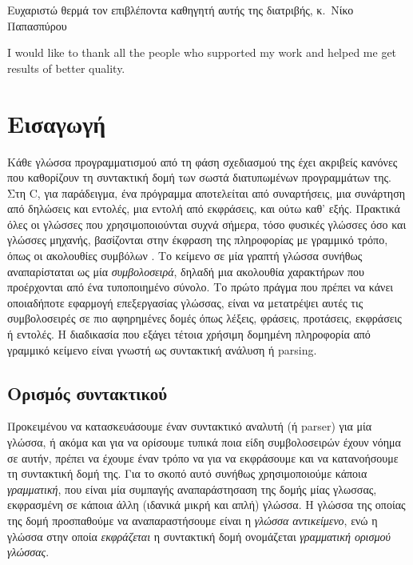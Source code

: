 \documentclass[diploma]{softlab-thesis}
\begin{document}

\begin{acknowledgementsgr}
  Ευχαριστώ θερμά τον επιβλέποντα καθηγητή αυτής της διατριβής,
  κ.~Νίκο Παπασπύρου
\end{acknowledgementsgr}

\begin{acknowledgementsen}
  I would like to thank all the people who supported my work and helped me get
  results of better quality.  
\end{acknowledgementsen}



\tableofcontents
\listoffigures


\mainmatter

\chapter{ Εισαγωγή }

Κάθε γλώσσα προγραμματισμού από τη φάση σχεδιασμού της έχει ακριβείς κανόνες που καθορίζουν τη συντακτική δομή των σωστά διατυπωμένων προγραμμάτων της. \cite{dragon}
Στη C, για παράδειγμα, ένα πρόγραμμα αποτελείται από συναρτήσεις, μια συνάρτηση από δηλώσεις και εντολές, μια εντολή από εκφράσεις, και ούτω καθ' εξής.
Πρακτικά όλες οι γλώσσες που χρησιμοποιούνται συχνά σήμερα, τόσο φυσικές γλώσσες όσο και γλώσσες μηχανής, βασίζονται στην έκφραση της πληροφορίας με γραμμικό τρόπο, 
όπως οι ακολουθίες συμβόλων  \cite{ford-thesis}.
Το κείμενο σε μία γραπτή γλώσσα συνήθως αναπαρίσταται ως μία  \textit{ συμβολοσειρά}, δηλαδή μια ακολουθία χαρακτήρων που προέρχονται από ένα τυποποιημένο σύνολο. 
Το πρώτο πράγμα που πρέπει να κάνει οποιαδήποτε εφαρμογή επεξεργασίας γλώσσας, 
είναι να μετατρέψει αυτές τις συμβολοσειρές σε πιο αφηρημένες δομές όπως λέξεις, φράσεις, προτάσεις, εκφράσεις ή εντολές.
Η διαδικασία που εξάγει τέτοια χρήσιμη δομημένη πληροφορία από γραμμικό κείμενο είναι γνωστή ως συντακτική ανάλυση ή parsing.

\section{ Ορισμός συντακτικού}

Προκειμένου να κατασκευάσουμε έναν συντακτικό αναλυτή (ή  parser) για μία γλώσσα, ή ακόμα και για να ορίσουμε τυπικά ποια είδη συμβολοσειρών έχουν νόημα σε αυτήν, πρέπει να έχουμε έναν τρόπο να για να εκφράσουμε και να κατανοήσουμε τη συντακτική δομή της.
Για το σκοπό αυτό συνήθως χρησιμοποιούμε κάποια  \textit{ γραμματική}, που είναι μία συμπαγής αναπαράστησαση της δομής μίας γλωσσας, εκφρασμένη σε κάποια άλλη (ιδανικά μικρή και απλή) γλώσσα.
Η γλώσσα της οποίας της δομή προσπαθούμε να αναπαραστήσουμε είναι η  \textit{ γλώσσα αντικείμενο}, ενώ η γλώσσα στην οποία \textit{ εκφράζεται} η συντακτική δομή ονομάζεται  \textit{γραμματική ορισμού γλώσσας}. 
\end{document}
